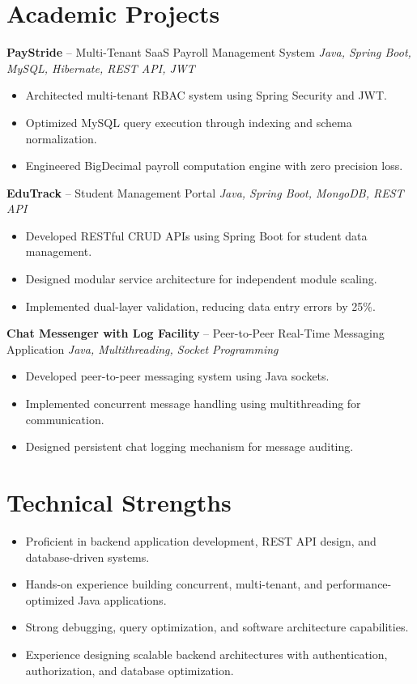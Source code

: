 \documentclass[10.5pt,a4paper]{article}
\begin{document}
\section{Academic Projects}
\textbf{PayStride} -- Multi-Tenant SaaS Payroll Management System \hfill \textit{Java, Spring Boot, MySQL, Hibernate, REST API, JWT}
\begin{itemize}
  \item Architected multi-tenant RBAC system using Spring Security and JWT.
  \item Optimized MySQL query execution through indexing and schema normalization.
  \item Engineered BigDecimal payroll computation engine with zero precision loss.
\end{itemize}
\vspace{4pt}
\textbf{EduTrack} -- Student Management Portal \hfill \textit{Java, Spring Boot, MongoDB, REST API}
\begin{itemize}
  \item Developed RESTful CRUD APIs using Spring Boot for student data management.
  \item Designed modular service architecture for independent module scaling.
  \item Implemented dual-layer validation, reducing data entry errors by 25\%.
\end{itemize}
\vspace{4pt}
\textbf{Chat Messenger with Log Facility} -- Peer-to-Peer Real-Time Messaging Application \hfill \textit{Java, Multithreading, Socket Programming}
\begin{itemize}
  \item Developed peer-to-peer messaging system using Java sockets.
  \item Implemented concurrent message handling using multithreading for communication.
  \item Designed persistent chat logging mechanism for message auditing.
\end{itemize}
\section{Technical Strengths}
\begin{itemize}
  \item Proficient in backend application development, REST API design, and database-driven systems.
  \item Hands-on experience building concurrent, multi-tenant, and performance-optimized Java applications.
  \item Strong debugging, query optimization, and software architecture capabilities.
  \item Experience designing scalable backend architectures with authentication, authorization, and database optimization.
\end{itemize}
\end{document}
